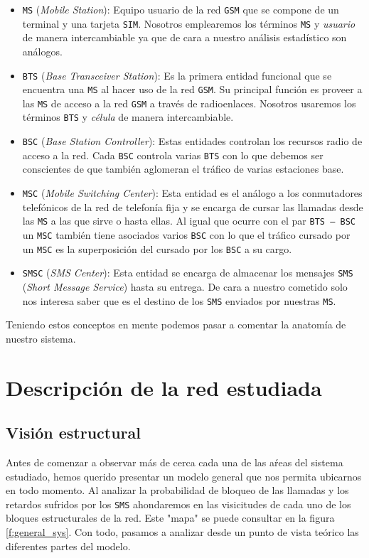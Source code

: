 \documentclass[10pt]{article}
\begin{document}
		\begin{itemize}
			\item \texttt{MS} (\textit{Mobile Station}): Equipo usuario de la red \texttt{GSM} que se compone de un terminal y una tarjeta \texttt{SIM}. Nosotros emplearemos los términos \texttt{MS} y \textit{usuario} de manera intercambiable ya que de cara a nuestro análisis estadístico son análogos.
			\item \texttt{BTS} (\textit{Base Transceiver Station}): Es la primera entidad funcional que se encuentra una \texttt{MS} al hacer uso de la red \texttt{GSM}. Su principal función es proveer a las \texttt{MS} de acceso a la red \texttt{GSM} a través de radioenlaces. Nosotros usaremos los términos \texttt{BTS} y \textit{célula} de manera intercambiable.
			\item \texttt{BSC} (\textit{Base Station Controller}): Estas entidades controlan los recursos radio de acceso a la red. Cada \texttt{BSC} controla varias \texttt{BTS} con lo que debemos ser conscientes de que también aglomeran el tráfico de varias estaciones base.
			\item \texttt{MSC} (\textit{Mobile Switching Center}): Esta entidad es el análogo a los conmutadores telefónicos de la red de telefonía fija y se encarga de cursar las llamadas desde las \texttt{MS} a las que sirve o hasta ellas. Al igual que ocurre con el par \texttt{BTS -- BSC} un \texttt{MSC} también tiene asociados varios \texttt{BSC} con lo que el tráfico cursado por un \texttt{MSC} es la superposición del cursado por los \texttt{BSC} a su cargo.
			\item \texttt{SMSC} (\textit{SMS Center}): Esta entidad se encarga de almacenar los mensajes \texttt{SMS} (\textit{Short Message Service}) hasta su entrega. De cara a nuestro cometido solo nos interesa saber que es el destino de los \texttt{SMS} enviados por nuestras \texttt{MS}.
		\end{itemize}

		Teniendo estos conceptos en mente podemos pasar a comentar la anatomía de nuestro sistema.

	\section{Descripción de la red estudiada}
		\subsection{Visión estructural}
			Antes de comenzar a observar más de cerca cada una de las aŕeas del sistema estudiado, hemos querido presentar un modelo general que nos permita ubicarnos en todo momento. Al analizar la probabilidad de bloqueo de las llamadas y los retardos sufridos por los \texttt{SMS} ahondaremos en las visicitudes de cada uno de los bloques estructurales de la red. Este "mapa" se puede consultar en la figura \ref{f:general_sys}. Con todo, pasamos a analizar desde un punto de vista teórico las diferentes partes del modelo.
\end{document}
